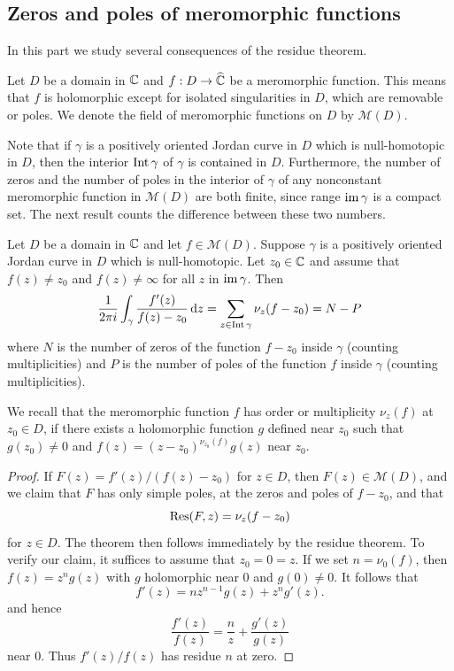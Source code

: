 \subsection{Zeros and poles of meromorphic functions}
In this part we study several consequences of the residue theorem.\par
Let $D$ be a domain in $\mathbb{C}$ and $f:D\to\widehat{\mathbb{C}}$ be a meromorphic function. This means that $f$ is holomorphic except for isolated singularities in $D$, which are removable or poles. We denote the field of meromorphic functions on $D$ by $\mathcal{M}(D)$.\par
Note that if $\gamma$ is a positively oriented Jordan curve in $D$ which is null-homotopic in $D$, then the interior $\mathrm{Int}\,\gamma$ of $\gamma$ is contained in $D$. Furthermore, the number of zeros and the number of poles in the interior of $\gamma$ of any nonconstant meromorphic function in $\mathcal{M}(D)$ are both finite, since range $\mathrm{im}\,\gamma$ is a compact set. The next result counts the difference between these two numbers.
\begin{theorem}
Let $D$ be a domain in $\mathbb{C}$ and let $f\in\mathcal{M}(D)$. Suppose $\gamma$ is a positively oriented Jordan curve in $D$ which is null-homotopic. Let $z_0\in\mathbb{C}$ and assume that $f(z)\neq z_0$ and $f(z)\neq\infty$ for all $z$ in $\mathrm{im}\,\gamma$. Then
\[\frac{1}{2\pi i}\int_{\gamma}\frac{f'(z)}{f(z)-z_0}\mathop{}\!\mathrm{d} z=\sum_{z\in\mathrm{Int}\,\gamma}\nu_{z}(f-z_0)=N-P\]
where $N$ is the number of zeros of the function $f-z_0$ inside $\gamma$ (counting multiplicities) and $P$ is the number of poles of the function $f$ inside $\gamma$ (counting multiplicities).
\end{theorem}
We recall that the meromorphic function $f$ has order or multiplicity $\nu_z(f)$ at $z_0\in D$, if there exists a holomorphic function $g$ defined near $z_0$ such that $g(z_0)\neq 0$ and $f(z)=(z-z_0)^{\nu_{z_0}(f)}g(z)$ near $z_0$.
\begin{proof}
If $F(z)=f'(z)/(f(z)-z_0)$ for $z\in D$, then $F(z)\in\mathcal{M}(D)$, and we claim that $F$ has only simple poles, at the zeros and poles of $f-z_0$, and that
\[\mathrm{Res}(F,z)=\nu_z(f-z_0)\]
for $z\in D$. The theorem then follows immediately by the residue theorem. To verify our claim, it suffices to assume that $z_0=0=z$. If we set $n=\nu_0(f)$, then $f(z)=z^ng(z)$ with $g$ holomorphic near $0$ and $g(0)\neq 0$. It follows that
\[f'(z)=nz^{n-1}g(z)+z^ng'(z).\]
and hence
\[\frac{f'(z)}{f(z)}=\frac{n}{z}+\frac{g'(z)}{g(z)}\]
near $0$. Thus $f'(z)/f(z)$ has residue $n$ at zero.
\end{proof}
